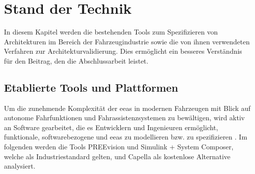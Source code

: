 
\chapter{Stand der Technik}
\label{sect:relatedWork}


In diesem Kapitel werden die bestehenden Tools zum Spezifizieren von Architekturen im Bereich der Fahrzeugindustrie sowie die von ihnen verwendeten Verfahren zur Architekturvalidierung. Dies ermöglicht ein besseres Verständnis für den Beitrag, den die Abschlussarbeit leistet.

\section{Etablierte Tools und Plattformen}
Um die zunehmende Komplexität der \glspl{eea} in modernen Fahrzeugen mit Blick auf autonome Fahrfunktionen und Fahrassistenzsystemen zu bewältigen, wird aktiv an Software gearbeitet, die es Entwicklern und Ingenieuren ermöglicht, funktionale, softwarebezogene und \glspl{eea} zu modellieren bzw. zu spezifizieren \cite{askaripoor2022architecture} \cite{schauffele2016architectural}. Im folgenden werden die Tools PREEvision und Simulink + System Composer, welche als Industriestandard gelten, und Capella als kostenlose Alternative analysiert.


